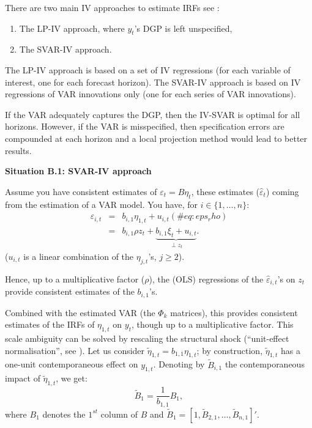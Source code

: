 \documentclass[
]{book}
\providecommand{\tightlist}{%
  \setlength{\itemsep}{0pt}\setlength{\parskip}{0pt}}
\theoremstyle{definition}
\theoremstyle{definition}
\theoremstyle{definition}
\theoremstyle{definition}
\theoremstyle{remark}
\begin{document}
There are two main IV approaches to estimate IRFs see \citet{Stock_Watson_2018}:

\begin{enumerate}
\def\labelenumi{\alph{enumi}.}
\tightlist
\item
  The LP-IV approach, where \(y_t\)'s DGP is left unspecified,
\item
  The SVAR-IV approach.
\end{enumerate}

The LP-IV approach is based on a set of IV regressions (for each variable of interest, one for each forecast horizon). The SVAR-IV approach is based on IV regressions of VAR innovations only (one for each series of VAR innovations).

If the VAR adequately captures the DGP, then the IV-SVAR is optimal for all horizons. However, if the VAR is misspecified, then specification errors are compounded at each horizon and a local projection method would lead to better results.

\textbf{Situation B.1: SVAR-IV approach}

Assume you have consistent estimates of \(\varepsilon_t = B\eta_t\), these estimates (\(\hat\varepsilon_{t}\)) coming from the estimation of a VAR model. You have, for \(i \in \{1,\dots,n\}\):
\begin{eqnarray}
\varepsilon_{i,t} &=& b_{i,1} \eta_{1,t} + u_{i,t} (\#eq:eps_rho)\\
&=& b_{i,1} \rho z_t + \underbrace{b_{i,1}\xi_t + u_{i,t}}_{\perp z_t}. \nonumber
\end{eqnarray}
(\(u_{i,t}\) is a linear combination of the \(\eta_{j,t}\)'s, \(j\ge2\)).

Hence, up to a multiplicative factor (\(\rho\)), the (OLS) regressions of the \(\hat\varepsilon_{i,t}\)'s on \(z_t\) provide consistent estimates of the \(b_{i,1}\)'s.

Combined with the estimated VAR (the \(\Phi_k\) matrices), this provides consistent estimates of the IRFs of \(\eta_{1,t}\) on \(y_t\), though up to a multiplicative factor. This scale ambiguity can be solved by rescaling the structural shock (``unit-effect normalisation'', see \citet{Stock_Watson_2018}). Let us consider \(\tilde\eta_{1,t}=b_{1,1}\eta_{1,t}\); by construction, \(\tilde\eta_{1,t}\) has a one-unit contemporaneous effect on \(y_{1,t}\). Denoting by \(\tilde{B}_{i,1}\) the contemporaneous impact of \(\tilde\eta_{1,t}\), we get:
\[
\tilde{B}_{1} = \frac{1}{b_{1,1}} {B}_{1},
\]
where \(B_{1}\) denotes the \(1^{st}\) column of \(B\) and \(\tilde{B}_{1}=[1,\tilde{B}_{2,1},\dots,\tilde{B}_{n,1}]'\).
\end{document}
